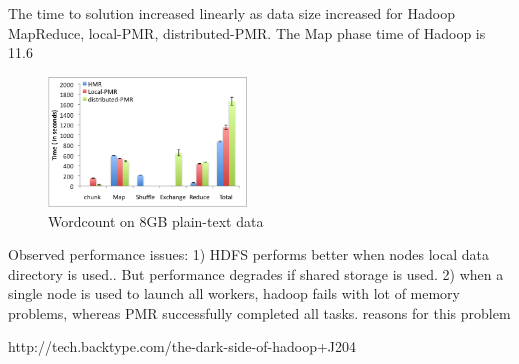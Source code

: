 \documentclass{acm_proc_article-sp}
\newcommand{\pnote}[1]{ {\textcolor{magenta} { ***pradeep: #1 }}}
\newcommand{\pnote}[1]{}
\begin{document}
The time to solution increased linearly as data size increased for Hadoop MapReduce, local-PMR, distributed-PMR. 
The Map phase time of Hadoop is 11.6


\begin{figure}[compMR_8GB]
	\centering
		\includegraphics[width=0.47\textwidth]{figures/comparision_8gb.png}
	\caption{Wordcount on 8GB plain-text data}
	\label{fig:figures_compMR_8GB}
\end{figure}


Observed performance issues:
1) HDFS performs better when nodes local data directory is used.. But performance degrades if shared storage is used. 			
2) when a single node is used to launch all workers, hadoop fails with lot of memory problems, whereas PMR successfully completed all tasks.			
reasons for this problem

http://tech.backtype.com/the-dark-side-of-hadoop+J204		
\end{document}
